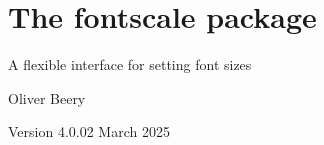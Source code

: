 \documentclass{article}
\begin{document}
\section*{\Large The \textsf{fontscale} package}

A flexible interface for setting font sizes

Oliver Beery

Version 4.0.0\quad{}2 March 2025

\end{document}
